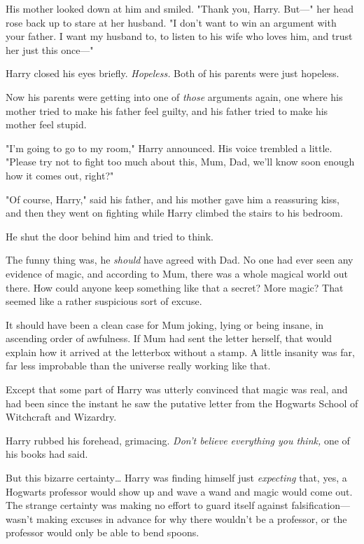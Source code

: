 His mother looked down at him and smiled. "Thank you, Harry. But---" her head
rose back up to stare at her husband. "I don't want to win an argument with
your father. I want my husband to, to listen to his wife who loves him, and
trust her just this once---"

Harry closed his eyes briefly. \emph{Hopeless.} Both of his parents were just
hopeless.

Now his parents were getting into one of \emph{those} arguments again, one
where his mother tried to make his father feel guilty, and his father tried to
make his mother feel stupid.

"I'm going to go to my room," Harry announced. His voice trembled a little.
"Please try not to fight too much about this, Mum, Dad, we'll know soon enough
how it comes out, right?"

"Of course, Harry," said his father, and his mother gave him a reassuring kiss,
and then they went on fighting while Harry climbed the stairs to his bedroom.

He shut the door behind him and tried to think.

The funny thing was, he \emph{should} have agreed with Dad. No one had ever
seen any evidence of magic, and according to Mum, there was a whole magical
world out there. How could anyone keep something like that a secret? More
magic? That seemed like a rather suspicious sort of excuse.

It should have been a clean case for Mum joking, lying or being insane, in
ascending order of awfulness. If Mum had sent the letter herself, that would
explain how it arrived at the letterbox without a stamp. A little insanity was
far, far less improbable than the universe really working like that.

Except that some part of Harry was utterly convinced that magic was real, and
had been since the instant he saw the putative letter from the Hogwarts School
of Witchcraft and Wizardry.

Harry rubbed his forehead, grimacing. \emph{Don't believe everything you
think,} one of his books had said.

But this bizarre certainty{\ldots} Harry was finding himself just
\emph{expecting} that, yes, a Hogwarts professor would show up and wave a wand
and magic would come out. The strange certainty was making no effort to guard
itself against falsification---wasn't making excuses in advance for why there
wouldn't be a professor, or the professor would only be able to bend spoons.

